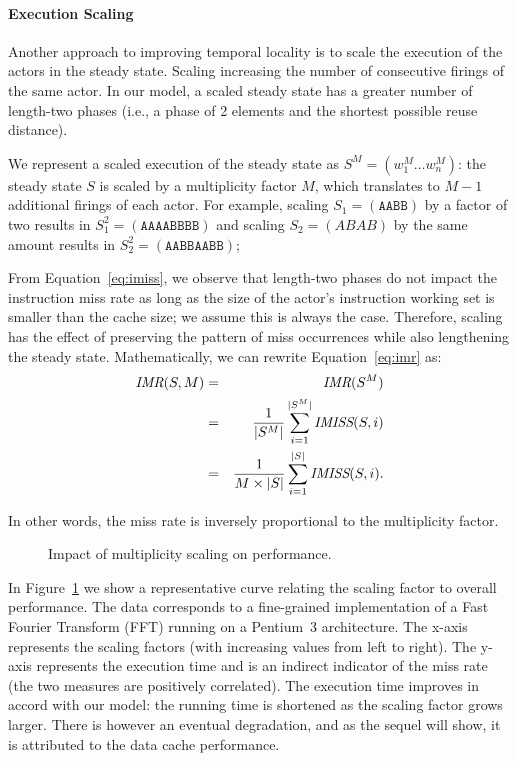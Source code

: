 \paragraph*{Execution Scaling}
Another approach to improving temporal locality is to scale the
execution of the actors in the steady state. Scaling increasing the
number of consecutive firings of the same actor. In our model, a
scaled steady state has a greater number of length-two phases (i.e., a
phase of 2 elements and the shortest possible reuse distance).

We represent a scaled execution of the steady state as
$S^M=(w_1^M\dots w_n^M)$: the steady state $S$ is scaled by a
multiplicity factor $M$, which translates to $M-1$ additional firings of
each actor. For example, scaling $S_1=(\texttt{AABB})$ by a factor of
two results in
$S_1^2=(\texttt{AAAABBBB})$
and scaling $S_2=(ABAB)$ by the same amount results in 
$S_2^2=(\texttt{AABBAABB})$;

From Equation~\ref{eq:imiss}, we observe that length-two  phases do
not impact the instruction miss rate  as long as the size of the actor's 
instruction working set  is smaller than the cache
size; we assume this is always the case. Therefore, scaling has the
effect of preserving the pattern of 
miss occurrences while also lengthening the steady state. Mathematically,
we can rewrite Equation~\ref{eq:imr} as:
\begin{eqnarray}
  \nonumber
  \mbox{\it IMR}(S, M) &=& \mbox{\it IMR}(S^M) \\
  \nonumber
                 &=& \frac{1}{|S^M|}\sum_{i=1}^{|S^M|} \mbox{\it IMISS}(S,i) \\
  \label{eq:imrM}
                 &=& \frac{1}{M \times |S|}\sum_{i=1}^{|S|} \mbox{\it IMISS}(S,i).
\end{eqnarray}

In other words, the miss rate is inversely proportional to the
multiplicity factor.
\begin{figure}[t]
\begin{center}
  \caption{Impact of multiplicity scaling on performance.}
 \label{fig:scaling-data}
\end{center}
\end{figure}

In Figure~\ref{fig:scaling-data} we show a
representative curve relating the scaling factor to overall
performance. The data corresponds to a fine-grained implementation of 
a Fast Fourier Transform (FFT) running on a Pentium~3 architecture. The
x-axis represents the scaling factors (with increasing values from
left to right). The y-axis represents the execution time and is an
indirect indicator of the miss rate (the two measures are positively
correlated). The execution time improves in accord with our model: 
the running time is shortened as the scaling factor grows larger. There
is however an eventual degradation, and as the sequel will show, it is 
attributed to the data cache performance.
